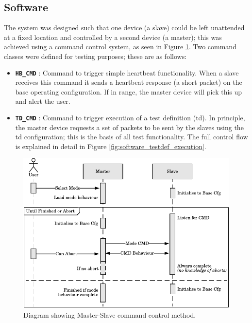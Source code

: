 \subsection{Software}
The system was designed such that one device (a slave) could be left unattended at a fixed location and controlled by a second device (a master); this was achieved using a command control system, as seen in Figure \ref{fig:software_cmd_system}. Two command classes were defined for testing purposes; these are as follows:
\begin{itemize}
	\item {\textbf{\texttt{HB\_CMD}}} : Command to trigger simple heartbeat functionality. When a slave receives this command it sends a heartbeat response (a short packet) on the base operating configuration. If in range, the master device will pick this up and alert the user.
	\item {\textbf{\texttt{TD\_CMD}}} : Command to trigger execution of a test definition (\ac{td}). In principle, the master device requests a set of packets to be sent by the slaves using the \ac{td} configuration; this is the basis of all test functionality. The full control flow is explained in detail in Figure \ref{fig:software_testdef_execution}.
\end{itemize}


\begin{figure}[H]
    \centering
    \includegraphics{Figures/software_cmd_system.pdf}
    \caption[Master-Slave command control method]{Diagram showing Master-Slave command control method.}
    \label{fig:software_cmd_system}
\end{figure}

